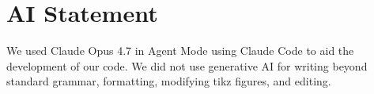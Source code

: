 \section{AI Statement}
\label{sec:acks}

We used Claude Opus 4.7 in Agent Mode using Claude Code to aid the development
of our code. We did not use generative AI for writing beyond standard grammar,
formatting, modifying tikz figures, and editing.
